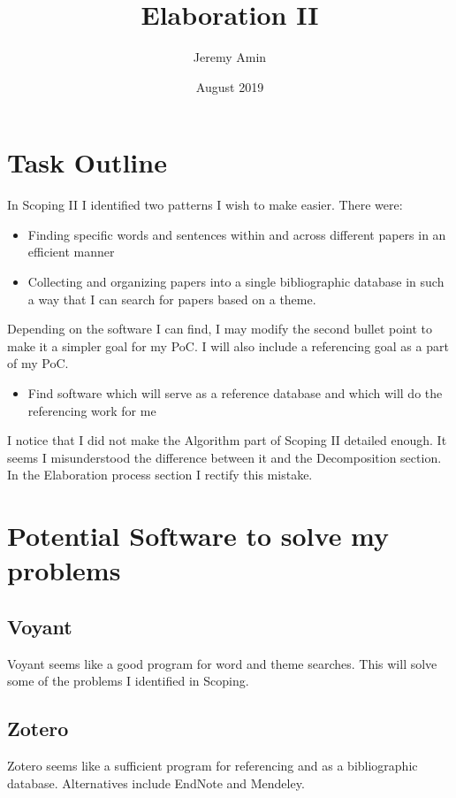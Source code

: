 \documentclass{article}
\title{Elaboration II}
\author{Jeremy Amin}
\date{August 2019}
\begin{document}
\maketitle

\tableofcontents

\section{Task Outline}

\noindent
In Scoping II I identified two patterns I wish to make easier. There were:

\begin{itemize}
    \item Finding specific words and sentences within and across different papers in an efficient manner
    \item Collecting and organizing papers into a single bibliographic database in such a way that I can search for papers based on a theme.

\end{itemize}

\noindent
Depending on the software I can find, I may modify the second bullet point to make it a simpler goal for my PoC. I will also include a referencing goal as a part of my PoC.

\begin{itemize}
    \item Find software which will serve as a reference database and which will do the referencing work for me 
\end{itemize}


\noindent
I notice that I did not make the Algorithm part of Scoping II detailed enough. It seems I misunderstood the difference between it and the Decomposition section. In the Elaboration process section I rectify this mistake.


\section{Potential Software to solve my problems}

\subsection{Voyant} 

Voyant seems like a good program for word and theme searches. This will solve some of the problems I identified in Scoping.

\subsection{Zotero}
Zotero seems like a sufficient program for referencing and as a bibliographic database. Alternatives include EndNote and Mendeley.
\end{document}
